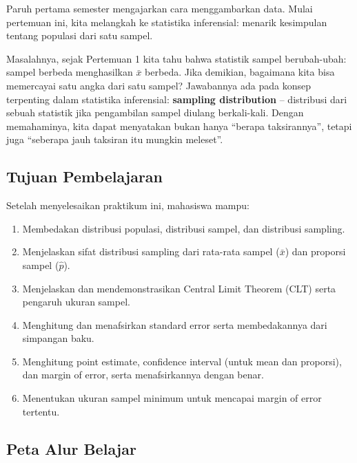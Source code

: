 \documentclass[
  indonesian,
  letterpaper,
]{book}
\providecommand{\tightlist}{%
  \setlength{\itemsep}{0pt}\setlength{\parskip}{0pt}}
\begin{document}
Paruh pertama semester mengajarkan cara menggambarkan data. Mulai
pertemuan ini, kita melangkah ke statistika inferensial: menarik
kesimpulan tentang populasi dari satu sampel.

Masalahnya, sejak Pertemuan 1 kita tahu bahwa statistik sampel
berubah-ubah: sampel berbeda menghasilkan \(\bar{x}\) berbeda. Jika
demikian, bagaimana kita bisa memercayai satu angka dari satu sampel?
Jawabannya ada pada konsep terpenting dalam statistika inferensial:
\textbf{sampling distribution} -- distribusi dari sebuah statistik jika
pengambilan sampel diulang berkali-kali. Dengan memahaminya, kita dapat
menyatakan bukan hanya ``berapa taksirannya'', tetapi juga ``seberapa
jauh taksiran itu mungkin meleset''.

\subsection{Tujuan Pembelajaran}\label{tujuan-pembelajaran}

Setelah menyelesaikan praktikum ini, mahasiswa mampu:

\begin{enumerate}
\def\labelenumi{\arabic{enumi}.}
\tightlist
\item
  Membedakan distribusi populasi, distribusi sampel, dan distribusi
  sampling.
\item
  Menjelaskan sifat distribusi sampling dari rata-rata sampel
  (\(\bar{x}\)) dan proporsi sampel (\(\hat{p}\)).
\item
  Menjelaskan dan mendemonstrasikan Central Limit Theorem (CLT) serta
  pengaruh ukuran sampel.
\item
  Menghitung dan menafsirkan standard error serta membedakannya dari
  simpangan baku.
\item
  Menghitung point estimate, confidence interval (untuk mean dan
  proporsi), dan margin of error, serta menafsirkannya dengan benar.
\item
  Menentukan ukuran sampel minimum untuk mencapai margin of error
  tertentu.
\end{enumerate}

\subsection{Peta Alur Belajar}\label{peta-alur-belajar}
\end{document}
